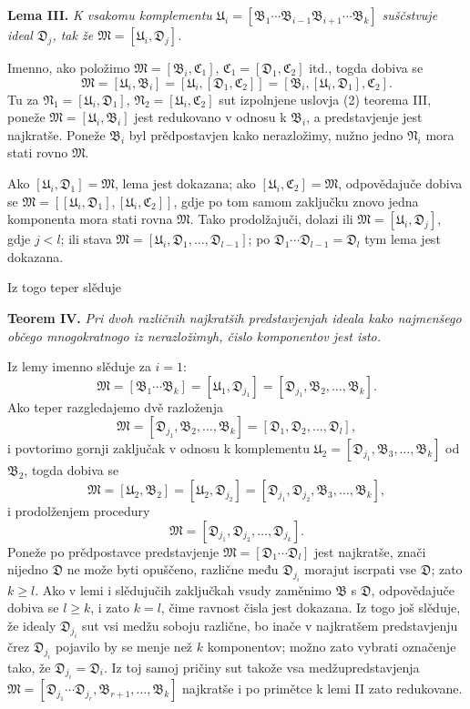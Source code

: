 \documentclass[11pt]{article}
\newcommand{\ideal}[1]{\mathfrak{#1}}
\begin{document}
\textbf{Lema III.} \emph{K vsakomu komplementu \(\ideal U_i=[\ideal B_1\cdots\ideal B_{i-1}\ideal B_{i+1}\cdots\ideal B_k]\) suščstvuje ideal \(\ideal D_j\), tak že \(\ideal M=[\ideal U_i,\ideal D_j]\).}

Imenno, ako položimo \(\ideal M=[\ideal B_i,\ideal C_1]\), \(\ideal C_1=[\ideal D_1,\ideal C_2]\) itd., togda dobiva se
\[
 \ideal M=[\ideal U_i,\ideal B_i]=[\ideal U_i,[\ideal D_1,\ideal C_2]]=[\ideal B_i,[\ideal U_i,\ideal D_1],\ideal C_2].
\]
Tu za \(\ideal N_1=[\ideal U_i,\ideal D_1]\), \(\ideal N_2=[\ideal U_i,\ideal C_2]\) sut izpolnjene uslovja (2) teorema III, poneže \(\ideal M=[\ideal U_i,\ideal B_i]\) jest redukovano v odnosu k \(\ideal B_i\), a predstavjenje jest najkratše. Poneže \(\ideal B_i\) byl prědpostavjen kako nerazložimy, nužno jedno \(\ideal N_i\) mora stati rovno \(\ideal M\).

Ako \([\ideal U_i,\ideal D_1]=\ideal M\), lema jest dokazana; ako \([\ideal U_i,\ideal C_2]=\ideal M\), odpovědajuče dobiva se \(\ideal M=[[\ideal U_i,\ideal D_1],[\ideal U_i,\ideal C_2]]\), gdje po tom samom zaključku znovo jedna komponenta mora stati rovna \(\ideal M\). Tako prodolžajuči, dolazi ili \(\ideal M=[\ideal U_i,\ideal D_j]\), gdje \(j<l\); ili stava \(\ideal M=[\ideal U_i,\ideal D_1,\ldots,\ideal D_{l-1}]\); po \(\ideal D_1\cdots\ideal D_{l-1}=\ideal D_l\) tym lema jest dokazana.

Iz togo teper slěduje

\textbf{Teorem IV.} \emph{Pri dvoh različnih najkratših predstavjenjah ideala kako najmenšego občego mnogokratnogo iz nerazložimyh, čislo komponentov jest isto.}

Iz lemy imenno slěduje za \(i=1\):
\[
 \ideal M=[\ideal B_1\cdots\ideal B_k]=[\ideal U_1,\ideal D_{j_1}]
 =[\ideal D_{j_1},\ideal B_2,\ldots,\ideal B_k].
\]
Ako teper razgledajemo dvě razloženja
\[
 \ideal M=[\ideal D_{j_1},\ideal B_2,\ldots,\ideal B_k]
          =[\ideal D_1,\ideal D_2,\ldots,\ideal D_l],
\]
i povtorimo gornji zaključak v odnosu k komplementu \(\ideal U_2=[\ideal D_{j_1},\ideal B_3,\ldots,\ideal B_k]\) od \(\ideal B_2\), togda dobiva se
\[
 \ideal M=[\ideal U_2,\ideal B_2]=[\ideal U_2,\ideal D_{j_2}]
          =[\ideal D_{j_1},\ideal D_{j_2},\ideal B_3,\ldots,\ideal B_k],
\]
i prodolženjem procedury
\[
 \ideal M=[\ideal D_{j_1},\ideal D_{j_2},\ldots,\ideal D_{j_k}].
\]
Poneže po prědpostavce predstavjenje \(\ideal M=[\ideal D_1\cdots\ideal D_l]\) jest najkratše, znači nijedno \(\ideal D\) ne može byti opuščeno, različne među \(\ideal D_{j_i}\) morajut iscrpati vse \(\ideal D\); zato \(k\ge l\). Ako v lemi i slědujučih zaključkah vsudy zaměnimo \(\ideal B\) s \(\ideal D\), odpovědajuče dobiva se \(l\ge k\), i zato \(k=l\), čime ravnost čisla jest dokazana. Iz togo još slěduje, že idealy \(\ideal D_{j_i}\) sut vsi medžu soboju različne, bo inače v najkratšem predstavjenju črez \(\ideal D_{j_i}\) pojavilo by se menje než \(k\) komponentov; možno zato vybrati označenje tako, že \(\ideal D_{j_i}=\ideal D_i\). Iz toj samoj pričiny sut takože vsa medžupredstavjenja \(\ideal M=[\ideal D_{j_1}\cdots\ideal D_{j_r},\ideal B_{r+1},\ldots,\ideal B_k]\) najkratše i po primětce k lemi II zato redukovane.
\end{document}
